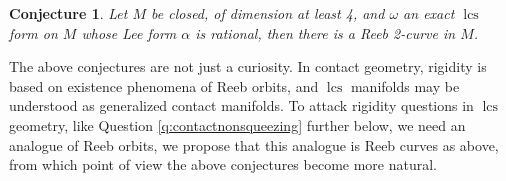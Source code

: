 \documentclass{amsart}
\numberwithin{equation}{section}
\newtheorem{conjecture}{Conjecture}
\theoremstyle{definition}
\theoremstyle{remark}
\DeclareMathOperator{\lcs}{lcs}
\DeclareMathOperator{\lcsm}{lcsm}
\begin{document}
\begin{conjecture} \label{conjecture:WeinsteinStrong} Let $M$ be closed, of dimension at least 4,  and $\omega$ an exact $\lcs$ form on $M$ whose Lee form $\alpha$ is rational, then there is a Reeb 2-curve in $M$. 
\end{conjecture}

The above conjectures are not just a curiosity. In contact geometry, rigidity is based on  existence phenomena of Reeb orbits, and $\lcs$ manifolds may be understood as generalized contact manifolds. To attack rigidity questions in $\lcs$ geometry, like Question \ref{q:contactnonsqueezing} further below, we need an analogue of Reeb orbits, we propose that this analogue is Reeb curves as above, from which point of view the above conjectures become more natural.

\end{document}
